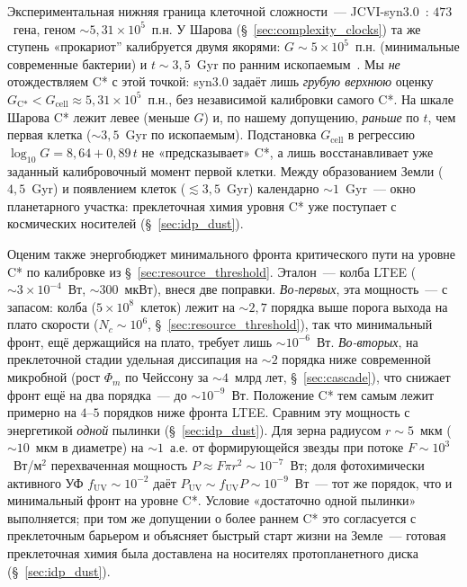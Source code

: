 \documentclass[12pt,a4paper]{article}
\begin{document}
Экспериментальная нижняя граница клеточной сложности~--- JCVI-syn3.0~\cite{Hutchison2016}: $473$~гена, геном $\sim 5{,}31\times10^{5}$~п.н. У Шарова (\S~\ref{sec:complexity_clocks}) та же ступень «прокариот'' калибруется двумя якорями: $G \sim 5\times10^{5}$~п.н. (минимальные современные бактерии) и $t \sim 3{,}5$~Gyr по ранним ископаемым~\cite{Sharov,Sharov2013}. Мы \emph{не} отождествляем C* с этой точкой: syn3.0 задаёт лишь \emph{грубую верхнюю} оценку $G_{\text{C*}} < G_{\text{cell}} \approx 5{,}31\times10^{5}$~п.н., без независимой калибровки самого C*. На шкале Шарова C* лежит левее (меньше $G$) и, по нашему допущению, \emph{раньше} по $t$, чем первая клетка ($\sim 3{,}5$~Gyr по ископаемым). Подстановка $G_{\text{cell}}$ в регрессию $\log_{10}G = 8{,}64 + 0{,}89\,t$ не «предсказывает» C*, а лишь восстанавливает уже заданный калибровочный момент первой клетки. Между образованием Земли ($4{,}5$~Gyr) и появлением клеток ($\lesssim 3{,}5$~Gyr) календарно $\sim 1$~Gyr~--- окно планетарного участка: преклеточная химия уровня C* уже поступает с космических носителей (\S~\ref{sec:idp_dust}).

Оценим также энергобюджет минимального фронта критического пути на уровне C* по калибровке из \S~\ref{sec:resource_threshold}. Эталон~--- колба LTEE ($\sim 3 \times 10^{-4}$~Вт, $\sim 300$~мкВт), внеся две поправки. \emph{Во-первых}, эта мощность~--- с запасом: колба ($5\times10^{8}$~клеток) лежит на $\sim 2{,}7$ порядка выше порога выхода на плато скорости ($N_c\sim 10^{6}$, \S~\ref{sec:resource_threshold}), так что минимальный фронт, ещё держащийся на плато, требует лишь $\sim 10^{-6}$~Вт. \emph{Во-вторых}, на преклеточной стадии удельная диссипация на $\sim 2$ порядка ниже современной микробной (рост $\Phi_m$ по Чейссону за $\sim 4$~млрд лет, \S~\ref{sec:cascade}), что снижает фронт ещё на два порядка~--- до $\sim 10^{-9}$~Вт. Положение C* тем самым лежит примерно на $4$--$5$ порядков ниже фронта LTEE. Сравним эту мощность с энергетикой \emph{одной} пылинки (\S~\ref{sec:idp_dust}). Для зерна радиусом $r \sim 5$~мкм ($\sim 10$~мкм в диаметре) на $\sim 1$~а.е. от формирующейся звезды при потоке $F \sim 10^3$~Вт/м$^2$ перехваченная мощность $P \approx F\pi r^2 \sim 10^{-7}$~Вт; доля фотохимически активного УФ $f_{\mathrm{UV}} \sim 10^{-2}$ даёт $P_{\mathrm{UV}} \sim f_{\mathrm{UV}} P \sim 10^{-9}$~Вт~--- тот же порядок, что и минимальный фронт на уровне C*. Условие «достаточно одной пылинки» выполняется; при том же допущении о более раннем C* это согласуется с преклеточным барьером и объясняет быстрый старт жизни на Земле~--- готовая преклеточная химия была доставлена на носителях протопланетного диска (\S~\ref{sec:idp_dust}).
\end{document}
